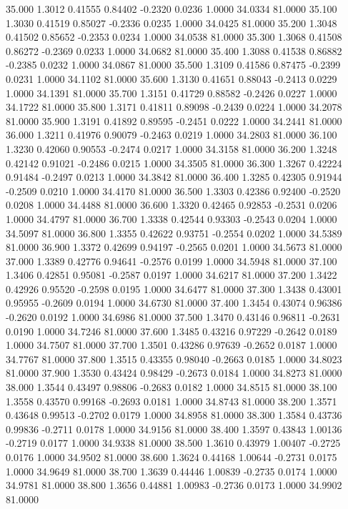   35.000   1.3012   0.41555   0.84402  -0.2320   0.0236   1.0000  34.0334  81.0000
  35.100   1.3030   0.41519   0.85027  -0.2336   0.0235   1.0000  34.0425  81.0000
  35.200   1.3048   0.41502   0.85652  -0.2353   0.0234   1.0000  34.0538  81.0000
  35.300   1.3068   0.41508   0.86272  -0.2369   0.0233   1.0000  34.0682  81.0000
  35.400   1.3088   0.41538   0.86882  -0.2385   0.0232   1.0000  34.0867  81.0000
  35.500   1.3109   0.41586   0.87475  -0.2399   0.0231   1.0000  34.1102  81.0000
  35.600   1.3130   0.41651   0.88043  -0.2413   0.0229   1.0000  34.1391  81.0000
  35.700   1.3151   0.41729   0.88582  -0.2426   0.0227   1.0000  34.1722  81.0000
  35.800   1.3171   0.41811   0.89098  -0.2439   0.0224   1.0000  34.2078  81.0000
  35.900   1.3191   0.41892   0.89595  -0.2451   0.0222   1.0000  34.2441  81.0000
  36.000   1.3211   0.41976   0.90079  -0.2463   0.0219   1.0000  34.2803  81.0000
  36.100   1.3230   0.42060   0.90553  -0.2474   0.0217   1.0000  34.3158  81.0000
  36.200   1.3248   0.42142   0.91021  -0.2486   0.0215   1.0000  34.3505  81.0000
  36.300   1.3267   0.42224   0.91484  -0.2497   0.0213   1.0000  34.3842  81.0000
  36.400   1.3285   0.42305   0.91944  -0.2509   0.0210   1.0000  34.4170  81.0000
  36.500   1.3303   0.42386   0.92400  -0.2520   0.0208   1.0000  34.4488  81.0000
  36.600   1.3320   0.42465   0.92853  -0.2531   0.0206   1.0000  34.4797  81.0000
  36.700   1.3338   0.42544   0.93303  -0.2543   0.0204   1.0000  34.5097  81.0000
  36.800   1.3355   0.42622   0.93751  -0.2554   0.0202   1.0000  34.5389  81.0000
  36.900   1.3372   0.42699   0.94197  -0.2565   0.0201   1.0000  34.5673  81.0000
  37.000   1.3389   0.42776   0.94641  -0.2576   0.0199   1.0000  34.5948  81.0000
  37.100   1.3406   0.42851   0.95081  -0.2587   0.0197   1.0000  34.6217  81.0000
  37.200   1.3422   0.42926   0.95520  -0.2598   0.0195   1.0000  34.6477  81.0000
  37.300   1.3438   0.43001   0.95955  -0.2609   0.0194   1.0000  34.6730  81.0000
  37.400   1.3454   0.43074   0.96386  -0.2620   0.0192   1.0000  34.6986  81.0000
  37.500   1.3470   0.43146   0.96811  -0.2631   0.0190   1.0000  34.7246  81.0000
  37.600   1.3485   0.43216   0.97229  -0.2642   0.0189   1.0000  34.7507  81.0000
  37.700   1.3501   0.43286   0.97639  -0.2652   0.0187   1.0000  34.7767  81.0000
  37.800   1.3515   0.43355   0.98040  -0.2663   0.0185   1.0000  34.8023  81.0000
  37.900   1.3530   0.43424   0.98429  -0.2673   0.0184   1.0000  34.8273  81.0000
  38.000   1.3544   0.43497   0.98806  -0.2683   0.0182   1.0000  34.8515  81.0000
  38.100   1.3558   0.43570   0.99168  -0.2693   0.0181   1.0000  34.8743  81.0000
  38.200   1.3571   0.43648   0.99513  -0.2702   0.0179   1.0000  34.8958  81.0000
  38.300   1.3584   0.43736   0.99836  -0.2711   0.0178   1.0000  34.9156  81.0000
  38.400   1.3597   0.43843   1.00136  -0.2719   0.0177   1.0000  34.9338  81.0000
  38.500   1.3610   0.43979   1.00407  -0.2725   0.0176   1.0000  34.9502  81.0000
  38.600   1.3624   0.44168   1.00644  -0.2731   0.0175   1.0000  34.9649  81.0000
  38.700   1.3639   0.44446   1.00839  -0.2735   0.0174   1.0000  34.9781  81.0000
  38.800   1.3656   0.44881   1.00983  -0.2736   0.0173   1.0000  34.9902  81.0000
